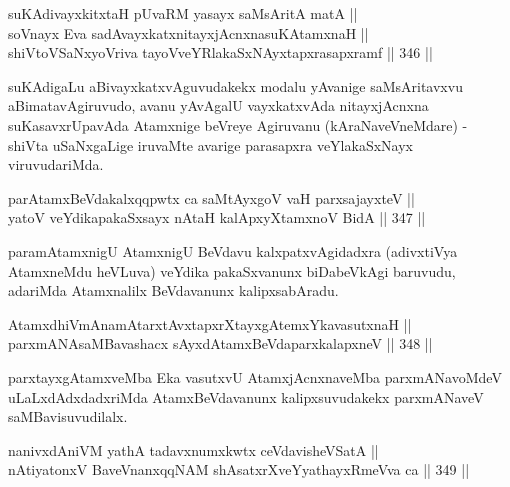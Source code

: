 
\begin{shl}
suKAdivayxkitxtaH pUvaRM yasayx saMsAritA matA || \\
soV\s nayx Eva sadAvayxkatxnitayxjAcnxnasuKAtamxnaH || \\
shiVtoVSaNxyoVriva tayoVveYRlakaSxNAyxtapxrasapxramf \hfill || 346 ||  
\end{shl}

\begin{artha}
suKAdigaLu aBivayxkatxvAguvudakekx modalu yAvanige saMsAritavxvu
aBimatavAgiruvudo, avanu yAvAgalU vayxkatxvAda nitayxjAcnxna
suKasavxrUpavAda Atamxnige beVreye Agiruvanu (kAraNaveVneMdare) -
shiVta uSaNxgaLige iruvaMte avarige parasapxra veYlakaSxNayx
viruvudariMda.
\end{artha}

\begin{shl}
parAtamxBeVdakalxqqpwtx ca saMtAyxgoV vaH parxsajayxteV || \\
yatoV veYdikapakaSxsayx nAtaH kalApxyX\s \s tamxnoV BidA \hfill || 347 ||  
\end{shl}

\begin{artha}
paramAtamxnigU AtamxnigU BeVdavu kalxpatxvAgidadxra (adivxtiVya
AtamxneMdu heVLuva) veYdika pakaSxvanunx biDabeVkAgi baruvudu,
adariMda Atamxnalilx BeVdavanunx kalipxsabAradu.
\end{artha}


\begin{shl}
AtamxdhiVmAnamAtarxtAvxtapxrXtayxgAtemxYkavasutxnaH || \\
parxmANAsaMBavashacx sAyxdAtamxBeVdaparxkalapxneV \hfill || 348 ||  
\end{shl}

\begin{artha}
parxtayxgAtamxveMba Eka vasutxvU AtamxjAcnxnaveMba parxmANavoMdeV
uLaLxdAdxdadxriMda AtamxBeVdavanunx kalipxsuvudakekx parxmANaveV
saMBavisuvudilalx.
\end{artha}

\begin{shl}
nanivxdAniVM yathA tadavxnumxkwtx ceVdavisheVSatA || \\
nAtiyatonxV BaveVnanxqqNAM shAsatxrXveYyathayxRmeVva ca \hfill || 349 ||  
\end{shl}

